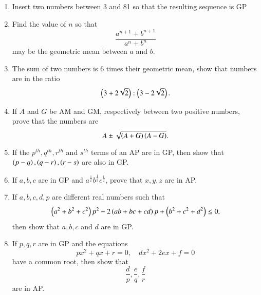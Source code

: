 \begin{enumerate}[label=\thesubsection.\arabic*.,ref=\thesubsection.\theenumi]
\item Insert two numbers between 3 and 81 so that the resulting sequence is GP 
\item Find the value of $n$ so that $$\frac{a^{n + 1} + b^{n + 1}}{a^n + b^n}$$ may be the geometric mean between $a$ and $b$.
\item The sum of two numbers is 6 times their geometric mean, show that numbers are in the ratio $$\left(3+2\sqrt{2}\right):\left(3-2\sqrt{2}\right).$$
\item If $A$ and $G$ be AM  and GM, respectively between two positive numbers, prove that the numbers are $$A \pm \sqrt{\left(A+G\right)\left(A-G\right)}.$$
\item If the $p^{th}, q^{th}, r^{th}$ and $s^{th}$ terms of an AP are in GP, then show that $\left(p-q\right),\left(q-r\right),\left(r-s\right)$ are also in GP.
\item If $a,b,c$ are in GP and $a^{\frac{1}{x}}b^{\frac{1}{y}}c^{\frac{1}{z}}$, prove that $x,y,z$ are in AP.
\item If $a, b, c, d, p$ are different real numbers such that 
	$$\left(a^2+b^2+c^2\right)p^2-2\left(ab+bc+cd\right)p+\left(b^2+c^2+d^2\right) \le 0,$$ then show that $a,b,c$ and $d$ are in GP.
\item If $p,q,r$ are in GP and the equations 
	$$px^2+qx+r = 0, \quad dx^2+2ex+f = 0$$
	have a common root, then show that
	$$\frac{d}{p},\frac{e}{q},\frac{f}{r}$$ are in AP.
\end{enumerate}
